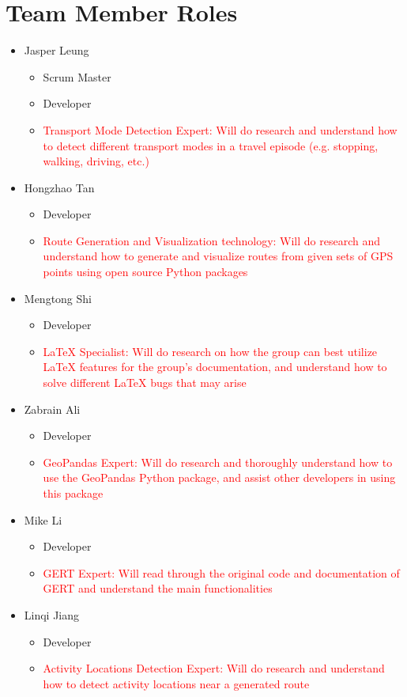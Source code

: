 \documentclass{article}
\begin{document}
\section{Team Member Roles}
\begin{itemize}
    \item Jasper Leung \begin{itemize} 
    \item Scrum Master 
    \item Developer
    \item \textcolor{red}{Transport Mode Detection Expert: Will do research and understand how to detect different transport modes in a travel episode (e.g. stopping, walking, driving, etc.)}
    \end{itemize}
    \item Hongzhao Tan 
    \begin{itemize}
        \item Developer
        \item \textcolor{red}{Route Generation and Visualization technology: Will do research and understand how to generate and visualize routes from given sets of GPS points using open source Python packages}
    \end{itemize}
    \item Mengtong Shi
    \begin{itemize}
        \item Developer
        \item \textcolor{red}{LaTeX Specialist: Will do research on how the group can best utilize LaTeX features for the group's documentation, and understand how to solve different LaTeX bugs that may arise}
    \end{itemize}
    \item Zabrain Ali 
    \begin{itemize}
        \item Developer
        \item \textcolor{red}{GeoPandas Expert: Will do research and thoroughly understand how to use the GeoPandas Python package, and assist other developers in using this package}
    \end{itemize}
    \item Mike Li
    \begin{itemize} 
        \item Developer 
        \item \textcolor{red}{GERT Expert: Will read through the original code and documentation of GERT and understand the main functionalities}
    \end{itemize}
    \item Linqi Jiang
    \begin{itemize} 
        \item Developer 
        \item \textcolor{red}{Activity Locations Detection Expert: Will do research and understand how to detect activity locations near a generated route}
    \end{itemize}
\end{itemize}
\end{document}
